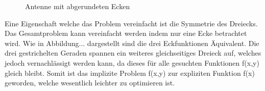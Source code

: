 		
\begin{figure}[htbp]
	\centering
	\caption{Antenne mit abgerundeten Ecken}
	\label{antennen:tikabgerundet}
\end{figure}
Eine Eigenschaft welche das Problem vereinfacht ist die Symmetrie des Dreiecks. Das Gesamtproblem kann vereinfacht werden indem nur eine Ecke betrachtet wird. Wie in Abbildung... dargestellt sind die drei Eckfunktionen Äquivalent. Die drei gestrichelten Geraden spannen ein weiteres gleichseitiges Dreieck auf, welches jedoch vernachlässigt werden kann, da dieses für alle gesuchten Funktionen f(x,y) gleich bleibt. Somit ist das implizite Problem f(x,y) zur expliziten Funktion f(x) geworden, welche wesentlich leichter zu optimieren ist.